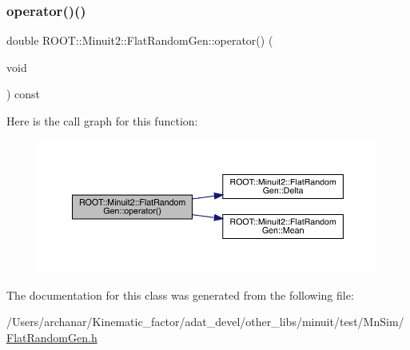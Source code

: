 \subsubsection{\texorpdfstring{operator()()}{operator()()}}
{\footnotesize\ttfamily double R\+O\+O\+T\+::\+Minuit2\+::\+Flat\+Random\+Gen\+::operator() (\begin{DoxyParamCaption}\item[{void}]{ }\end{DoxyParamCaption}) const\hspace{0.3cm}{\ttfamily [inline]}}

Here is the call graph for this function\+:\nopagebreak
\begin{figure}[H]
\begin{center}
\leavevmode
\includegraphics[width=350pt]{dc/d91/classROOT_1_1Minuit2_1_1FlatRandomGen_ac04ef969864af18fdfdc104f2491e031_cgraph}
\end{center}
\end{figure}


The documentation for this class was generated from the following file\+:\begin{DoxyCompactItemize}
\item 
/\+Users/archanar/\+Kinematic\+\_\+factor/adat\+\_\+devel/other\+\_\+libs/minuit/test/\+Mn\+Sim/\mbox{\hyperlink{FlatRandomGen_8h}{Flat\+Random\+Gen.\+h}}\end{DoxyCompactItemize}
